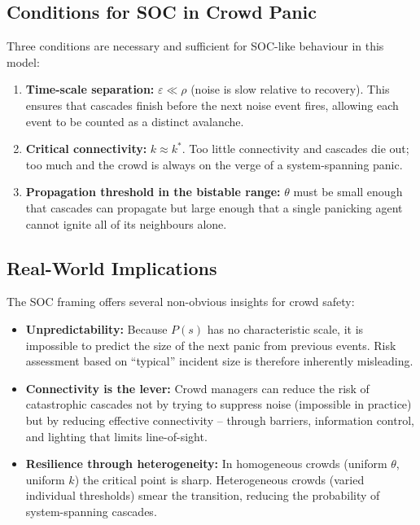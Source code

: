 \documentclass[12pt, a4paper]{article}
\begin{document}
\subsection{Conditions for SOC in Crowd Panic}

Three conditions are necessary and sufficient for SOC-like behaviour in this model:
\begin{enumerate}
  \item \textbf{Time-scale separation:} $\varepsilon \ll \rho$ (noise is slow
        relative to recovery).  This ensures that cascades finish before the next
        noise event fires, allowing each event to be counted as a distinct avalanche.
  \item \textbf{Critical connectivity:} $k \approx k^*$.  Too little connectivity
        and cascades die out; too much and the crowd is always on the verge of a
        system-spanning panic.
  \item \textbf{Propagation threshold in the bistable range:} $\theta$ must be
        small enough that cascades can propagate but large enough that a single
        panicking agent cannot ignite all of its neighbours alone.
\end{enumerate}

\subsection{Real-World Implications}

The SOC framing offers several non-obvious insights for crowd safety:
\begin{itemize}
  \item \textbf{Unpredictability:} Because $P(s)$ has no characteristic scale, it
        is impossible to predict the size of the next panic from previous events.
        Risk assessment based on ``typical'' incident size is therefore inherently
        misleading.
  \item \textbf{Connectivity is the lever:} Crowd managers can reduce the risk of
        catastrophic cascades not by trying to suppress noise (impossible in
        practice) but by reducing effective connectivity -- through barriers,
        information control, and lighting that limits line-of-sight.
  \item \textbf{Resilience through heterogeneity:} In homogeneous crowds
        (uniform $\theta$, uniform $k$) the critical point is sharp.
        Heterogeneous crowds (varied individual thresholds) smear the transition,
        reducing the probability of system-spanning cascades.
\end{itemize}
\end{document}
